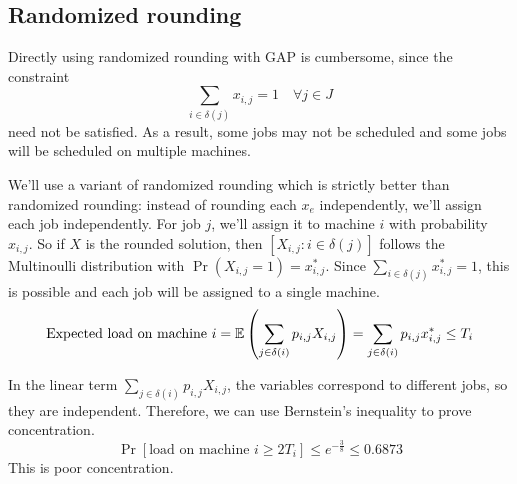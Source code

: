 \subsection{Randomized rounding}

Directly using randomized rounding with GAP is cumbersome, since the constraint
\[ \sum_{i \in \delta(j)} x_{i,j} = 1 \quad \forall j \in J \]
need not be satisfied. As a result, some jobs may not be scheduled
and some jobs will be scheduled on multiple machines.

We'll use a variant of randomized rounding which is strictly better than randomized rounding:
instead of rounding each $x_e$ independently, we'll assign each job independently.
For job $j$, we'll assign it to machine $i$ with probability $x_{i,j}$.
So if $X$ is the rounded solution, then $[X_{i,j}: i \in \delta(j)]$
follows the Multinoulli distribution with $\Pr(X_{i,j} = 1) = x_{i,j}^*$.
Since $\sum_{i \in \delta(j)} x_{i,j}^* = 1$, this is possible and each job
will be assigned to a single machine.
\[ \textrm{Expected load on machine } i
= \operatorname{\mathbb{E}}\left(\sum_{j \in \delta(i)} p_{i,j}X_{i,j}\right)
= \sum_{j \in \delta(i)} p_{i,j}x_{i,j}^*
\le T_i \]

In the linear term $\sum_{j \in \delta(i)} p_{i,j}X_{i,j}$,
the variables correspond to different jobs, so they are independent.
Therefore, we can use Bernstein's inequality to prove concentration.
\[ \Pr[\textrm{load on machine } i \ge 2T_i]
\le e^{-\frac{3}{8}} \le 0.6873 \]
This is poor concentration.
